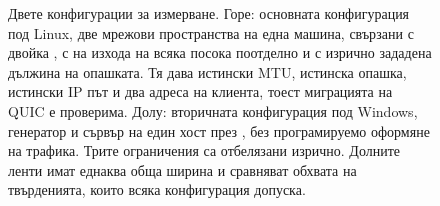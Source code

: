 \begin{figure}[htbp]
\caption{Двете конфигурации за измерване. Горе: основната конфигурация под Linux, две
мрежови пространства на една машина, свързани с двойка , с  на
изхода на всяка посока поотделно и с изрично зададена дължина на опашката. Тя дава
истински MTU, истинска опашка, истински IP път и два адреса на клиента, тоест миграцията
на QUIC е проверима. Долу: вторичната конфигурация под Windows, генератор и сървър на един
хост през , без програмируемо оформяне на трафика. Трите ограничения са
отбелязани изрично. Долните ленти имат еднаква обща ширина и сравняват обхвата на
твърденията, които всяка конфигурация допуска.}
\label{fig:measurement_topology}
\end{figure}

